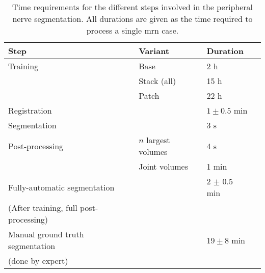 \begin{table}[htbp]
   \centering
   \caption[Time Requirements]{Time requirements for the different steps involved in the peripheral nerve segmentation. All durations are given as the time required to process a single \gls{mrn} case.}
   \begin{tabular}{l*{3}{l}}
      \toprule
      Step                  & Variant               & Duration\\
      \midrule
      Training              & Base                  & 2 h   \\
                            & Stack (all)           & 15 h  \\
                            & Patch                 & 22 h  \\
      \midrule
      Registration          &                       & $1 \pm 0.5$ min \\
      \midrule
      Segmentation          &                       & 3 s \\
      Post-processing       & $n$ largest volumes   & 4 s \\
                            & Joint volumes         & 1 min \\
      \midrule
      Fully-automatic segmentation & & 2 $\pm$ 0.5 min\\
      (After training, full post-processing)\\
      \midrule
      Manual ground truth segmentation & & $19 \pm 8$ min\\
      (done by expert) \\
      \bottomrule
   \end{tabular}
   \label{tab:results_durations}
\end{table}

\endinput